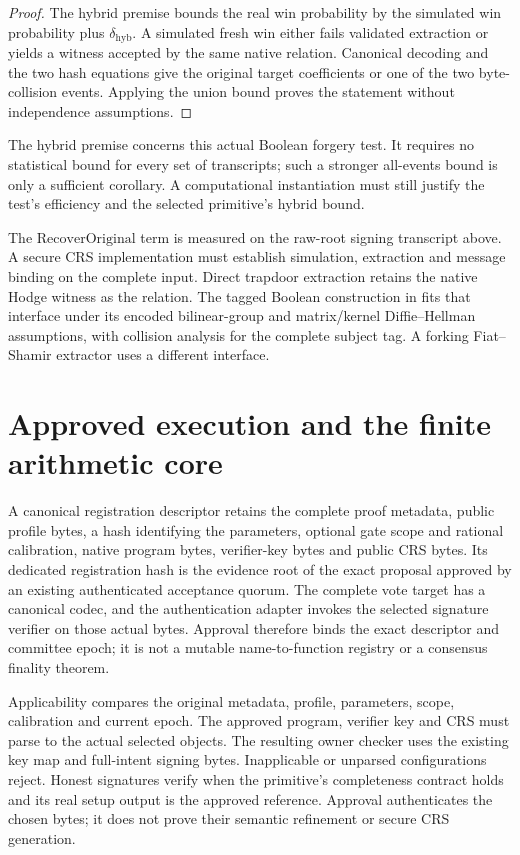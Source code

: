 \begin{proof}
The hybrid premise bounds the real win probability by the simulated win
probability plus \(\delta_{\mathrm{hyb}}\). A simulated fresh win either
fails validated extraction or yields a witness accepted by the same native
relation. Canonical decoding and the two hash equations give the original
target coefficients or one of the two byte-collision events. Applying the
union bound proves the statement without independence assumptions.
\end{proof}

The hybrid premise concerns this actual Boolean forgery test. It requires no
statistical bound for every set of transcripts; such a stronger all-events
bound is only a sufficient corollary. A computational instantiation must
still justify the test's efficiency and the selected primitive's hybrid bound.

The \(\mathrm{RecoverOriginal}\) term is measured on the raw-root signing
transcript above. A secure CRS implementation must establish simulation,
extraction and message binding on the complete input. Direct trapdoor extraction retains
the native Hodge witness as the relation. The tagged Boolean construction in
\cite[Sections 5--6]{bagheryEtAl2022signaturesKnowledge} fits that interface
under its encoded bilinear-group and matrix/kernel Diffie--Hellman assumptions,
with collision analysis for the complete subject tag. A forking
Fiat--Shamir extractor uses a different interface.

\section{Approved execution and the finite arithmetic core}

A canonical registration descriptor retains the complete proof metadata,
public profile bytes, a hash identifying the parameters, optional gate scope and rational
calibration, native program bytes, verifier-key bytes and public CRS bytes.
Its dedicated registration hash is the evidence root of the exact proposal
approved by an existing authenticated acceptance quorum. The complete vote
target has a canonical codec, and the authentication adapter invokes the
selected signature verifier on those actual bytes. Approval therefore binds
the exact descriptor and committee epoch; it is not a mutable name-to-function
registry or a consensus finality theorem.

Applicability compares the original metadata, profile, parameters, scope,
calibration and current epoch. The approved program, verifier key and CRS
must parse to the actual selected objects. The resulting owner checker uses
the existing key map and full-intent signing bytes. Inapplicable or unparsed
configurations reject. Honest signatures verify when the primitive's
completeness contract holds and its real setup output is the approved
reference. Approval authenticates the chosen bytes; it does not prove their
semantic refinement or secure CRS generation.

